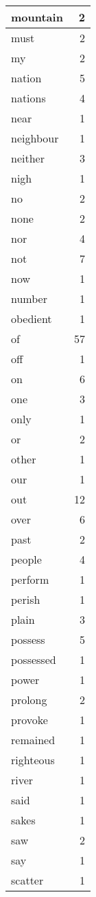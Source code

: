 \begin{center}
\begin{longtable}{l|r}
mountain & 2 \\ \hline
must & 2 \\ \hline
my & 2 \\ \hline
nation & 5 \\ \hline
nations & 4 \\ \hline
near & 1 \\ \hline
neighbour & 1 \\ \hline
neither & 3 \\ \hline
nigh & 1 \\ \hline
no & 2 \\ \hline
none & 2 \\ \hline
nor & 4 \\ \hline
not & 7 \\ \hline
now & 1 \\ \hline
number & 1 \\ \hline
obedient & 1 \\ \hline
of & 57 \\ \hline
off & 1 \\ \hline
on & 6 \\ \hline
one & 3 \\ \hline
only & 1 \\ \hline
or & 2 \\ \hline
other & 1 \\ \hline
our & 1 \\ \hline
out & 12 \\ \hline
over & 6 \\ \hline
past & 2 \\ \hline
people & 4 \\ \hline
perform & 1 \\ \hline
perish & 1 \\ \hline
plain & 3 \\ \hline
possess & 5 \\ \hline
possessed & 1 \\ \hline
power & 1 \\ \hline
prolong & 2 \\ \hline
provoke & 1 \\ \hline
remained & 1 \\ \hline
righteous & 1 \\ \hline
river & 1 \\ \hline
said & 1 \\ \hline
sakes & 1 \\ \hline
saw & 2 \\ \hline
say & 1 \\ \hline
scatter & 1 \\ \hline

\end{longtable}
\end{center}
